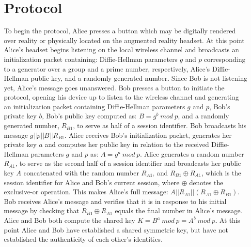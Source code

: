 \documentclass[12pt]{report}
\begin{document}
\section{Protocol}
To begin the protocol, Alice presses a button which may be digitally rendered over reality or physically located on the augmented reality headset. At this point Alice's headset begins listening on the local wireless channel and broadcasts an initialization packet containing: Diffie-Hellman parameters $g$ and $p$ corresponding to a generator over a group and a prime number, respectively, Alice's Diffie-Hellman public key, and a randomly generated number. Since Bob is not listening yet, Alice's message goes unanswered. Bob presses a button to initiate the protocol, opening his device up to listen to the wireless channel and generating an initialization packet containing Diffie-Hellman parameters $g$ and $p$, Bob's private key $b$, Bob's public key computed as: $B = g^b \: mod \: p$, and a randomly generated number, $R_{B1}$, to serve as half of a session identifier. Bob broadcasts his message $g || p || B || R_{B1}$. Alice receives Bob's initialization packet, generates her private key $a$ and computes her public key in relation to the received Diffie-Hellman parameters $g$ and $p$ as: $A = g^a \: mod \: p$. Alice generates a random number $R_{A1}$, to serve as the second half of a session identifier and broadcasts her public key $A$ concatenated with the random number $R_{A1}$, and $R_{B1} \oplus R_{A1}$, which is the session identifier for Alice and Bob's current session, where $\oplus$ denotes the exclusive-or operation. This makes Alice's full message: $A || R_{A1} || (R_{A1} \oplus R_{B1})$. Bob receives Alice's message and verifies that it is in response to his initial message by checking that $R_{B1} \oplus R_{A1}$ equals the final number in Alice's message. Alice and Bob both compute the shared key $K = B^a \: mod \: p = A^b \: mod \: p$. At this point Alice and Bob have established a shared symmetric key, but have not established the authenticity of each other's identities. \par
\end{document}
